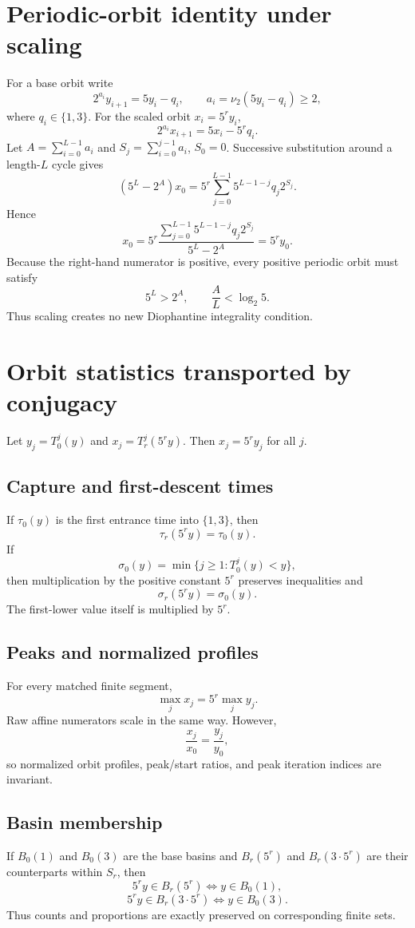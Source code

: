 \documentclass[11pt]{article}
\theoremstyle{remark}\newtheorem{remark}{Remark}
\begin{document}
\section{Periodic-orbit identity under scaling}
For a base orbit write
\[
2^{a_i}y_{i+1}=5y_i-q_i,\qquad a_i=\nu_2(5y_i-q_i)\ge2,
\]
where $q_i\in\{1,3\}$. For the scaled orbit $x_i=5^ry_i$,
\[
2^{a_i}x_{i+1}=5x_i-5^rq_i.
\]
Let $A=\sum_{i=0}^{L-1}a_i$ and $S_j=\sum_{i=0}^{j-1}a_i$, $S_0=0$. Successive substitution around a length-$L$ cycle gives
\[
(5^L-2^A)x_0
=5^r\sum_{j=0}^{L-1}5^{L-1-j}q_j2^{S_j}.
\]
Hence
\[
x_0=5^r\frac{\sum_{j=0}^{L-1}5^{L-1-j}q_j2^{S_j}}{5^L-2^A}=5^ry_0.
\]
Because the right-hand numerator is positive, every positive periodic orbit must satisfy
\[
5^L>2^A,\qquad \frac{A}{L}<\log_2 5.
\]
Thus scaling creates no new Diophantine integrality condition.

\section{Orbit statistics transported by conjugacy}
Let $y_j=T_0^j(y)$ and $x_j=T_r^j(5^ry)$. Then $x_j=5^ry_j$ for all $j$.

\subsection{Capture and first-descent times}
If $\tau_0(y)$ is the first entrance time into $\{1,3\}$, then
\[
\tau_r(5^ry)=\tau_0(y).
\]
If
\[
\sigma_0(y)=\min\{j\ge1:T_0^j(y)<y\},
\]
then multiplication by the positive constant $5^r$ preserves inequalities and
\[
\sigma_r(5^ry)=\sigma_0(y).
\]
The first-lower value itself is multiplied by $5^r$.

\subsection{Peaks and normalized profiles}
For every matched finite segment,
\[
\max_j x_j=5^r\max_j y_j.
\]
Raw affine numerators scale in the same way.  However,
\[
\frac{x_j}{x_0}=\frac{y_j}{y_0},
\]
so normalized orbit profiles, peak/start ratios, and peak iteration indices are invariant.

\subsection{Basin membership}
If $B_0(1)$ and $B_0(3)$ are the base basins and $B_r(5^r)$ and $B_r(3\cdot5^r)$ are their counterparts within $S_r$, then
\[
5^ry\in B_r(5^r)\iff y\in B_0(1),
\]
\[
5^ry\in B_r(3\cdot5^r)\iff y\in B_0(3).
\]
Thus counts and proportions are exactly preserved on corresponding finite sets.
\end{document}
